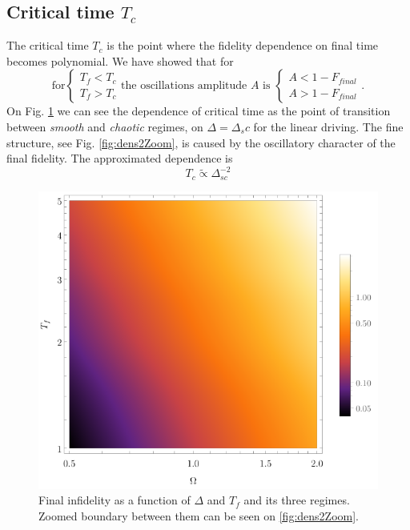 \subsection{Critical time $T_c$}
The critical time $T_c$ is the point where the fidelity dependence on final time becomes polynomial. We have showed that for 
\begin{equation}
    \text{for}\begin{cases}
        T_f<T_c \\
        T_f>T_c 
    \end{cases}\text{the oscillations amplitude } A \text{ is }
    \begin{cases}
        A<1-F_{final}\\
        A>1-F_{final}
    \end{cases}.
\end{equation}
On Fig. \ref{fig:dens2} we can see the dependence of critical time as the point of transition between \emph{smooth} and \emph{chaotic} regimes, on $\Delta=\Delta_sc$ for the linear driving. The fine structure, see Fig. \ref{fig:dens2Zoom}, is caused by the oscillatory character of the final fidelity. The approximated dependence is
\begin{equation}
    T_c\tilde\propto \Delta_{sc}^{-2}
\end{equation}


\begin{figure}[H]
    \centering 
    \includegraphics[scale=1.2]{../img/dens2.pdf}
    \caption{Final infidelity as a function of $\Delta$ and $T_f$ and its three regimes. Zoomed boundary between them can be seen on \ref{fig:dens2Zoom}.}
    \label{fig:dens2}
\end{figure}

